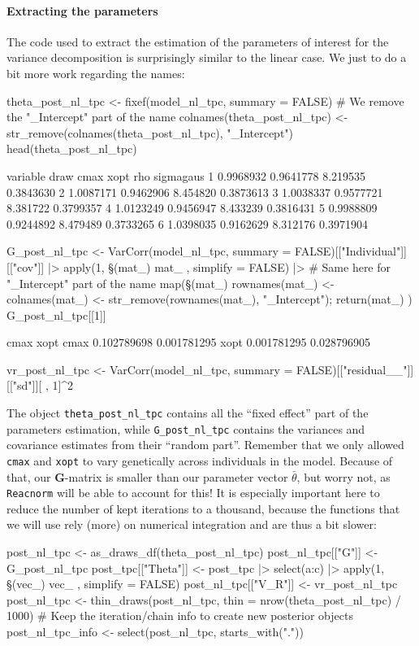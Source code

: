 \documentclass[a4paper,12pt,twoside]{article}
\begin{document}
\paragraph{Extracting the parameters}
The code used to extract the estimation of the parameters of interest for the variance decomposition is surprisingly similar to the linear case.
We just to do a bit more work regarding the names:
\begin{Rinput}
theta_post_nl_tpc <- fixef(model_nl_tpc, summary = FALSE)
# We remove the "_Intercept" part of the name
colnames(theta_post_nl_tpc) <- str_remove(colnames(theta_post_nl_tpc), "_Intercept")
head(theta_post_nl_tpc)
\end{Rinput}
\begin{Routput}
    variable
draw      cmax      xopt      rho sigmagaus
   1 0.9968932 0.9641778 8.219535 0.3843630
   2 1.0087171 0.9462906 8.454820 0.3873613
   3 1.0038337 0.9577721 8.381722 0.3799357
   4 1.0123249 0.9456947 8.433239 0.3816431
   5 0.9988809 0.9244892 8.479489 0.3733265
   6 1.0398035 0.9162629 8.312176 0.3971904
\end{Routput}
\begin{Rinput}
G_post_nl_tpc <-
    VarCorr(model_nl_tpc, summary = FALSE)[["Individual"]][["cov"]] |>
    apply(1, \§§(mat_) { mat_ }, simplify = FALSE) |>
    # Same here for "_Intercept" part of the name
    map(\§§(mat_) { rownames(mat_) <- colnames(mat_) <- str_remove(rownames(mat_), "_Intercept"); return(mat_) })
G_post_nl_tpc[[1]]
\end{Rinput}
\begin{Routput}
            cmax        xopt
cmax 0.102789698 0.001781295
xopt 0.001781295 0.028796905
\end{Routput}
\begin{Rinput}
vr_post_nl_tpc <-
    VarCorr(model_nl_tpc, summary = FALSE)[["residual__"]][["sd"]][ , 1]^2
\end{Rinput}
The object \texttt{theta\_post\_nl\_tpc} contains all the ``fixed effect'' part of the parameters estimation, while \texttt{G\_post\_nl\_tpc} contains the variances and covariance estimates from their ``random part''.
Remember that we only allowed \texttt{cmax} and \texttt{xopt} to vary genetically across individuals in the model.
Because of that, our $\mathbf{G}$-matrix is smaller than our parameter vector $\bar{\theta}$, but worry not, as \texttt{Reacnorm} will be able to account for this!
It is especially important here to reduce the number of kept iterations to a thousand, because the functions that we will use rely (more) on numerical integration and are thus a bit slower:
\begin{Rinput}
post_nl_tpc <- as_draws_df(theta_post_nl_tpc)
post_nl_tpc[["G"]] <- G_post_nl_tpc
post_tpc[["Theta"]] <-
    post_tpc |>
    select(a:c) |>
    apply(1, \§§(vec_) { vec_ }, simplify = FALSE)
post_nl_tpc[["V_R"]] <- vr_post_nl_tpc
post_nl_tpc <- thin_draws(post_nl_tpc, thin = nrow(theta_post_nl_tpc) / 1000)
# Keep the iteration/chain info to create new posterior objects
post_nl_tpc_info <- select(post_nl_tpc, starts_with("."))
\end{Rinput}
\end{document}
